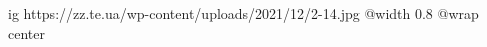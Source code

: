  
 
 
 
 

\ifcmt
  ig https://zz.te.ua/wp-content/uploads/2021/12/2-14.jpg
  @width 0.8
	@wrap center
\fi
